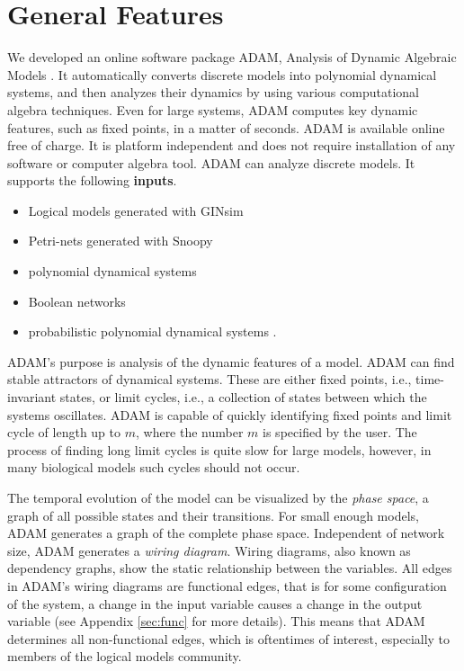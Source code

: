 \documentclass[11pt]{amsart}
\begin{document}
\section{General Features}
We developed an
online software package ADAM, Analysis of Dynamic Algebraic Models \cite{ADAM}. It automatically converts discrete models into polynomial dynamical
systems, and then analyzes their dynamics by using various computational algebra techniques. Even for large systems, ADAM
computes key dynamic features, such as fixed points, in a matter of seconds.
ADAM is available online free of charge. It is platform
independent and does not require installation of any software or computer
algebra tool.
ADAM can analyze discrete models. It supports the following {\bf inputs}.
\begin{itemize}
\item Logical models generated with GINsim \cite{GINsim}
\item Petri-nets generated with Snoopy \cite{Snoopy}
\item polynomial dynamical systems
\item Boolean networks
\item probabilistic polynomial dynamical systems \cite{shmulevich}.
\end{itemize}
ADAM’s purpose is analysis of the dynamic features of a model. ADAM can find stable attractors of dynamical systems. These are either fixed points, i.e., time-invariant states,
or limit cycles, i.e., a collection of states between which the systems oscillates. ADAM is capable of quickly identifying fixed points and limit cycle of length up to $m$, where the number $m$ is specified by the user. The process of finding long limit cycles is quite slow for large models, however, in many biological models such cycles should not occur. 
 
The temporal evolution of the model can be visualized by the {\it phase space}, a graph of all possible states and their transitions. For small enough models, ADAM generates a graph of the complete phase space. Independent of network size, ADAM generates a {\it wiring diagram}. Wiring diagrams, also known as dependency graphs, show the static relationship between the variables. All edges in ADAM’s wiring diagrams are functional edges, that is for some configuration of the system, a change in the input variable causes a change in the output variable (see Appendix \ref{sec:func} for more details). This means that ADAM determines all non-functional edges, which is oftentimes of interest, especially to members of the logical models community.
 
\end{document}
